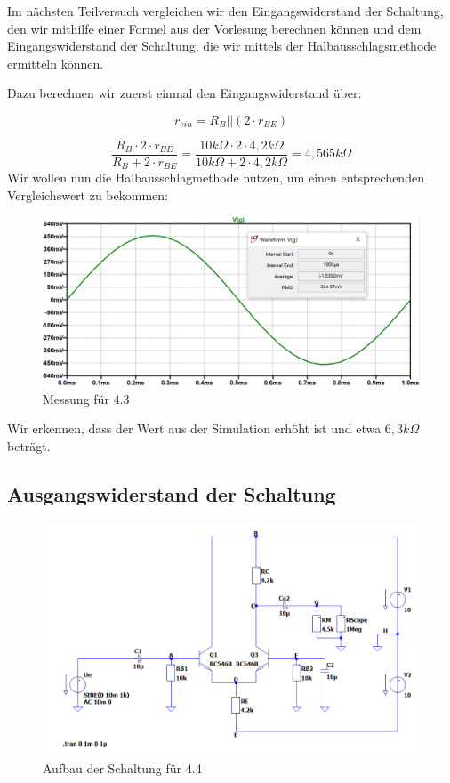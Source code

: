 \documentclass{article}
\begin{document}
Im nächsten Teilversuch vergleichen wir den Eingangswiderstand der Schaltung, den wir mithilfe einer Formel aus der Vorlesung berechnen können und dem Eingangswiderstand der Schaltung, die wir mittels der Halbausschlagsmethode ermitteln können.

Dazu berechnen wir zuerst einmal den Eingangswiderstand über:

\begin{equation}
  \label{eq:8}
  r_{ein} = R_{B}||(2\cdot r_{BE})
\end{equation}

\begin{equation*}
  \label{eq:9}
  \frac{R_{B}\cdot 2\cdot r_{BE}}{R_{B}+2\cdot r_{BE}} = \frac{10k\Omega \cdot 2 \cdot 4,2k\Omega}{10k\Omega + 2\cdot 4,2k\Omega} = 4,565k\Omega
\end{equation*}
\newpage
Wir wollen nun die Halbausschlagmethode nutzen, um einen entsprechenden Vergleichswert zu bekommen:

\begin{figure}[h]
  \centering
  \includegraphics[width=\textwidth]{../assets/images/EL2P1/abb6.png}
  \caption{Messung für 4.3}
  \label{fig:input2}
\end{figure}

Wir erkennen, dass der Wert aus der Simulation erhöht ist und etwa $6,3k\Omega$ beträgt.
\newpage
\subsection{Ausgangswiderstand der Schaltung}

\begin{figure}[h]
  \centering
  \includegraphics[width=\textwidth]{../assets/images/EL2P1/abb7.png}
  \caption{Aufbau der Schaltung für 4.4}
  \label{fig:schalt44}
\end{figure}
\end{document}
